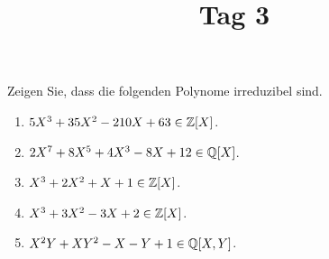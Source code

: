 \documentclass{scrartcl}
\title{\vspace{-1em}Tag 3}
\author{}
\date{}
\begin{document}
\maketitle
\vspace{-7em}

\begin{exercise}
  Zeigen Sie, dass die folgenden Polynome irreduzibel sind.
  \begin{enumerate}
    \item
      $5 X^3 + 35 X^2 - 210 X + 63 \in \mathbb{Z}[X]$.
    \item
      $2 X^7 + 8 X^5 + 4 X^3 - 8 X + 12 \in \mathbb{Q}[X]$.
    \item
      $X^3 + 2 X^2 + X + 1 \in \mathbb{Z}[X]$.
    \item
      $X^3 + 3 X^2 - 3X + 2 \in \mathbb{Z}[X]$.
    \item
      $X^2 Y + X Y^2 - X - Y + 1 \in \mathbb{Q}[X, Y]$.
  \end{enumerate}
\end{exercise}
\end{document}
